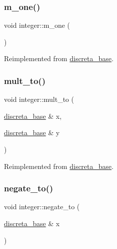 \mbox{\label{classinteger_a4d312656ed6c31235e11ecb3f05df1f5}} 
\subsubsection{\texorpdfstring{m\+\_\+one()}{m\_one()}}
{\footnotesize\ttfamily void integer\+::m\+\_\+one (\begin{DoxyParamCaption}{ }\end{DoxyParamCaption})\hspace{0.3cm}{\ttfamily [virtual]}}



Reimplemented from \mbox{\hyperlink{classdiscreta__base_a3a147eee6f3477387f7e580c117e5a05}{discreta\+\_\+base}}.

\mbox{\label{classinteger_a7f4f072c0d9c6b15660d80e81496dffc}} 
\subsubsection{\texorpdfstring{mult\+\_\+to()}{mult\_to()}}
{\footnotesize\ttfamily void integer\+::mult\+\_\+to (\begin{DoxyParamCaption}\item[{\mbox{\hyperlink{classdiscreta__base}{discreta\+\_\+base}} \&}]{x,  }\item[{\mbox{\hyperlink{classdiscreta__base}{discreta\+\_\+base}} \&}]{y }\end{DoxyParamCaption})\hspace{0.3cm}{\ttfamily [virtual]}}



Reimplemented from \mbox{\hyperlink{classdiscreta__base_a54d5c16c016769e3365639721c06591e}{discreta\+\_\+base}}.

\mbox{\label{classinteger_a1da2bd683bdef336057ef2b84d4b3978}} 
\subsubsection{\texorpdfstring{negate\+\_\+to()}{negate\_to()}}
{\footnotesize\ttfamily void integer\+::negate\+\_\+to (\begin{DoxyParamCaption}\item[{\mbox{\hyperlink{classdiscreta__base}{discreta\+\_\+base}} \&}]{x }\end{DoxyParamCaption})\hspace{0.3cm}{\ttfamily [virtual]}}



